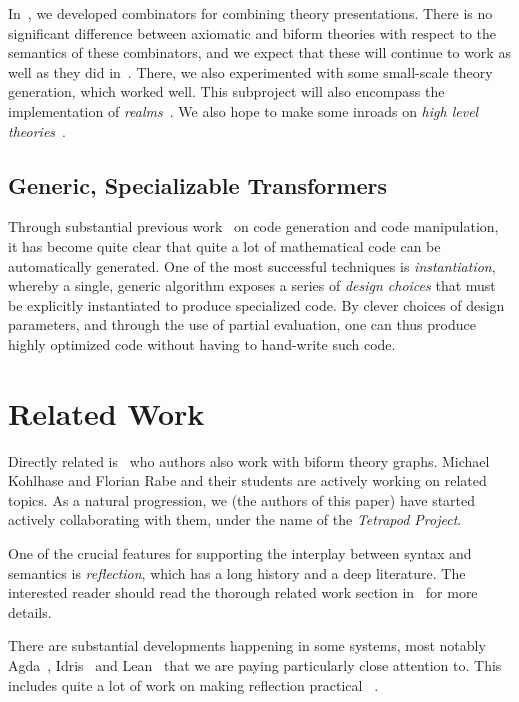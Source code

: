 \documentclass[fleqn]{llncs}
\begin{document}
In~\cite{CaretteOConnorTPC}, we developed combinators for combining
theory presentations. There is no significant difference between
axiomatic and biform theories with respect to the semantics of
these combinators, and we expect that these will continue to work
as well as they did in~\cite{MathSchemeExper}. There, we also
experimented with some small-scale theory generation, which worked
well. This subproject will also encompass the implementation of
\emph{realms}~\cite{CaretteEtAl14}.  We also hope to make some
inroads on \emph{high level theories}~\cite{CaretteFarmer08}.

\subsection*{Generic, Specializable Transformers}

Through substantial previous work~%
\cite{CaretteKS09,Carette06,CaElSm11,MathSchemeExper,CaretteKiselyov2005,CaretteKiselyov11,CaretteKucera07,CaretteKucera11,carette2016simplifying,KuceraCarette06,Larjani13,narayanan2016probabilistic}
on code generation and code manipulation, it has become quite clear that
quite a lot of mathematical code can be automatically generated.
One of the most successful techniques is \emph{instantiation},
whereby a single, generic algorithm exposes a series of
\emph{design choices} that must be explicitly instantiated to produce
specialized code. By clever choices of design parameters, and through the
use of partial evaluation, one can thus produce highly optimized code
without having to hand-write such code.

\section{Related Work}

Directly related is~\cite{KohlhaseManceRabe13} who authors also work
with biform theory graphs. Michael Kohlhase and Florian Rabe and their
students are actively working on related topics. As a natural
progression, we (the authors of this paper) have started actively
collaborating with them, under the name of the \emph{Tetrapod
  Project}.

One of the crucial features for supporting the interplay between
syntax and semantics is \emph{reflection}, which has a long history
and a deep literature. The interested reader should read the 
thorough related work section in~\cite{Farmer18} for more details.

There are substantial developments happening in some systems, most
notably Agda~\cite{Norell07,Norell09}, Idris~\cite{Brady13} and
Lean~\cite{Lean} that we are paying particularly close attention to.  This includes
quite a lot of work on making reflection practical~%
\cite{Christiansen:2016,Christiansen:2014,ebner2017metaprogramming,VanDerWalt12}.
\end{document}
